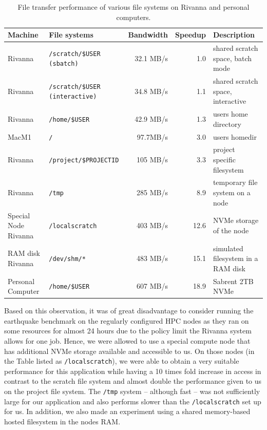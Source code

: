 \documentclass[utf8]{FrontiersinVancouver} %
\begin{document}
\begin{table}[htb]
  \caption{File transfer performance of various file systems on Rivanna and personal computers.}
  \label{tab:file-performance}
  \begin{center}
  {\footnotesize 
    \begin{tabular}{|llrrp{4.5cm}|}
      \hline
    Machine & File systems & Bandwidth & Speedup & Description \\
    \hline
    \hline
    Rivanna & \verb|/scratch/$USER  (sbatch)|     &  32.1 MB/s  & 1.0 & shared scratch space, batch mode \\
    Rivanna & \verb|/scratch/$USER (interactive)| &  34.8 MB/s  & 1.1 & shared scratch space, interactive \\
    Rivanna & \verb|/home/$USER|                    & 42.9 MB/s  & 1.3 & users home directory \\
    MacM1   & \verb|/| &  97.7MB/s & 3.0 & users homedir \\
    Rivanna & \verb|/project/$PROJECTID |     &  105 MB/s  & 3.3 & project specific filesystem \\
    Rivanna & \verb|/tmp|                         &  285 MB/s  & 8.9 & temporary file system on a node \\
    Special Node Rivanna & \verb|/localscratch|  &  403 MB/s  & 12.6 & NVMe storage of the node\\
    RAM disk Rivanna  & \verb|/dev/shm/*|      &    483 MB/s  & 15.1 & simulated filesystem in a RAM disk\\
    Personal Computer & \verb|/home/$USER| &  607 MB/s &  18.9 & Sabrent 2TB NVMe\\
    \hline
    \end{tabular}
  }
    \end{center}
\end{table}
  


Based on this observation, it was of great disadvantage to consider running the earthquake benchmark on the regularly configured HPC  nodes as they ran on some resources for almost 24 hours due to the policy limit the Rivanna system allows for one job. Hence, we were allowed to use a special compute node that has additional NVMe storage available and accessible to us. On those nodes (in the Table listed as \verb|/localscratch|), we were able to obtain a very suitable performance for this application while having a 10 times fold increase in access in contrast to the scratch file system and almost double the performance given to us on the project file system. The \verb|/tmp| system -- although fast -- was not sufficiently large for our application and also performs slower than the \verb|/localscratch| set up for us. In addition, we also made an experiment using a shared memory-based hosted filesystem in the nodes RAM.
\end{document}

